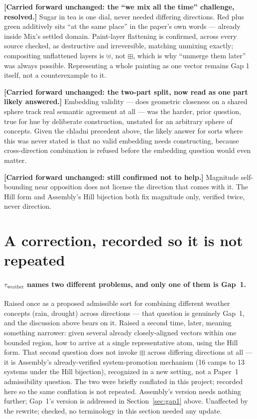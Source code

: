 \documentclass[11pt]{article}
\begin{document}
\textbf{[Carried forward unchanged: the ``we mix all the time''
challenge, resolved.]} Sugar in tea is one dial, never needed
differing directions. Red plus green additively sits ``at the same
place'' in the paper's own words --- already inside Mix's settled
domain. Paint-layer flattening is confirmed, across every source
checked, as destructive and irreversible, matching unmixing exactly;
compositing unflattened layers is $\uplus$, not $\boxplus$, which is
why ``unmerge them later'' was always possible. Representing a whole
painting as one vector remains Gap 1 itself, not a counterexample to
it.

\textbf{[Carried forward unchanged: the two-part split, now read as
one part likely answered.]} Embedding validity --- does geometric
closeness on a shared sphere track real semantic agreement at all ---
was the harder, prior question, true for hue by deliberate
construction, unstated for an arbitrary sphere of concepts. Given the
chladni precedent above, the likely answer for sorts where this was
never stated is that no valid embedding needs constructing, because
cross-direction combination is refused before the embedding question
would even matter.

\textbf{[Carried forward unchanged: still confirmed not to help.]}
Magnitude self-bounding near opposition does not license the
direction that comes with it. The Hill form and Assembly's Hill
bijection both fix magnitude only, verified twice, never direction.

\section{A correction, recorded so it is not repeated}

\paragraph{$\tau_{\text{weather}}$ names two different problems, and
only one of them is Gap~1.} Raised once as a proposed admissible sort
for combining different weather concepts (rain, drought) across
directions --- that question is genuinely Gap~1, and the discussion
above bears on it. Raised a second time, later, meaning something
narrower: given several already closely-aligned vectors within one
bounded region, how to arrive at a single representative atom, using
the Hill form. That second question does not invoke $\boxplus$ across
differing directions at all --- it is Assembly's already-verified
system-promotion mechanism (16 camps to 13 systems under the Hill
bijection), recognized in a new setting, not a Paper~1 admissibility
question. The two were briefly conflated in this project; recorded
here so the same conflation is not repeated. Assembly's version needs
nothing further; Gap~1's version is addressed in
Section~\ref{sec:gap1} above. Unaffected by the rewrite; checked, no
terminology in this section needed any update.
\end{document}
